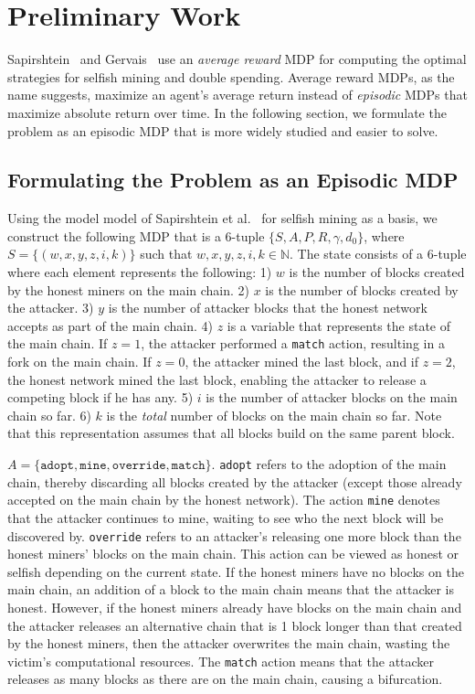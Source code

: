 \section{Preliminary Work}
Sapirshtein~\cite{sapirshtein:2015} and Gervais~\cite{Gervais:2016} use an {\em average reward} MDP for computing the optimal strategies for selfish mining and double spending. Average reward MDPs, as the name suggests, maximize an agent's average return instead of {\em episodic} MDPs that maximize absolute return over time. In the following section, we formulate the problem as an episodic MDP that is more widely studied and easier to solve.

\subsection{Formulating the Problem as an Episodic MDP}
 Using the model model of Sapirshtein et al.~\cite{sapirshtein:2015} for selfish mining as a basis, we construct the following MDP that is a 6-tuple $\{S, A, P, R, \gamma, d_0\}$, where $S = \{(w, x, y, z, i, k)\}$ such that $w, x, y, z, i, k \in \mathbb{N}$. The state consists of a 6-tuple where each element represents the following: 1) $w$ is the number of blocks created by the honest miners on the main chain. 2) $x$ is the number of blocks created by the attacker. 3) $y$ is the number of attacker blocks that the honest network accepts as part of the main chain. 4) $z$ is a variable that represents the state of the main chain. If $z = 1$, the attacker performed a {\tt match} action, resulting in a fork on the main chain. If $z = 0$, the attacker mined the last block, and if $z = 2$, the honest network mined the last block, enabling the attacker to release a competing block if he has any. 5) $i$ is the number of attacker blocks on the main chain so far. 6) $k$ is the {\em total} number of blocks on the main chain so far. Note that this representation assumes that all blocks build on the same parent block.

 $A = \{\texttt{adopt}, \texttt{mine}, \texttt{override}, \texttt{match}\}$. \texttt{adopt} refers to the adoption of the main chain, thereby discarding all blocks created by the attacker (except those already accepted on the main chain by the honest network). The action \texttt{mine} denotes that the attacker continues to mine, waiting to see who the next block will be discovered by. \texttt{override} refers to an attacker's releasing one more block than the honest miners' blocks on the main chain. This action can be viewed as honest or selfish depending on the current state. If the honest miners have no blocks on the main chain, an addition of a block to the main chain means that the attacker is honest. However, if the honest miners already have blocks on the main chain and the attacker releases an alternative chain that is 1 block longer than that created by the honest miners, then the attacker overwrites the main chain, wasting the victim's computational resources. The \texttt{match} action means that the attacker releases as many blocks as there are on the main chain, causing a bifurcation.

